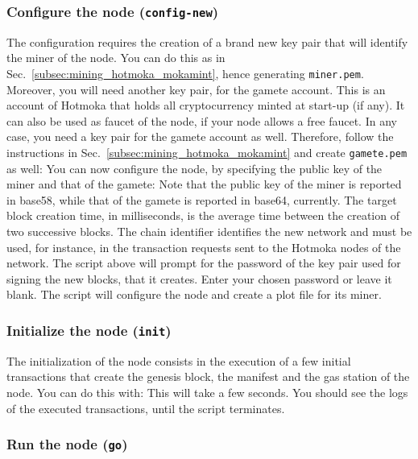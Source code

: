 \subsubsection{Configure the node (\texttt{config-new})}\label{subsubsec:mokamint_config_new}

The configuration requires the creation of a brand new key pair that will identify the miner of the node.
You can do this as in Sec.~\ref{subsec:mining_hotmoka_mokamint},
hence generating \texttt{miner.pem}.
Moreover, you will need another key pair, for the gamete account.
This is an account of Hotmoka that holds all cryptocurrency minted at start-up (if any).
It can also be used as faucet of the node, if your node allows a free faucet.
In any case, you need a key pair for the gamete account as well.
Therefore, follow the instructions in Sec.~\ref{subsec:mining_hotmoka_mokamint} and create
\texttt{gamete.pem} as well:
%
%
You can now configure the node, by specifying the public key of the miner and that of the gamete:
%
%
Note that the public key of the miner is reported in base58,
while that of the gamete is reported in base64, currently.
The target block creation time, in milliseconds, is the average time between the creation of two successive blocks.
The chain identifier identifies the new network and must be used, for instance,
in the transaction requests sent to the Hotmoka nodes of the network.
The script above will prompt for the password of the key pair used for signing the new blocks, that it creates.
Enter your chosen password or leave it blank. The script will configure the node and create a plot file for its miner.

\subsubsection{Initialize the node (\texttt{init})}\label{subsubsec:mokamint_init_node}

The initialization of the node consists in the execution of a few initial transactions
that create the genesis block, the manifest and the gas station of the node. You can do this with:
%
%
This will take a few seconds. You should see the logs of the executed transactions,
until the script terminates.

\subsubsection{Run the node (\texttt{go})}\label{subsubsec:mokamint_go_new_node}

